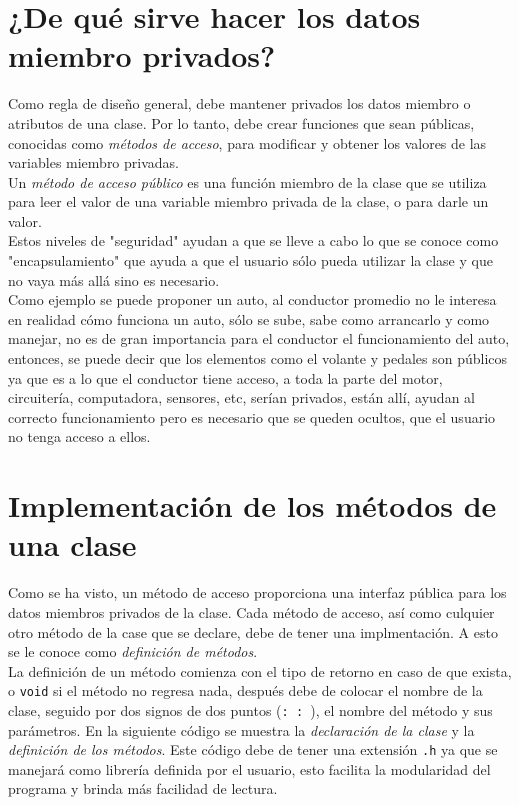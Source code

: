 \documentclass[12pt]{extarticle}
\newcommand{\<}{\langle}
\renewcommand{\>}{\rangle}
\theoremstyle{definition}
\begin{document}
\section{¿De qué sirve hacer los datos miembro privados? }
Como regla de diseño general, debe mantener privados los datos miembro o atributos  de una clase. Por lo tanto, debe crear funciones que sean públicas, conocidas como \textit{métodos de acceso}, para modificar  y obtener los valores de las variables miembro privadas.  \\

Un \textit{método de acceso público} es una función miembro de la clase que se utiliza para leer el valor de una variable miembro privada de la clase, o para darle un valor. \\

Estos niveles de "seguridad" ayudan a que se lleve a cabo lo que se conoce como "encapsulamiento" que ayuda a que el usuario sólo pueda utilizar la clase y que no vaya más allá sino es necesario. \\

Como ejemplo se puede proponer un auto, al conductor promedio no le interesa en realidad cómo funciona un auto, sólo se sube, sabe como arrancarlo y como manejar, no es de gran importancia para el conductor el funcionamiento del auto, entonces, se puede decir que los elementos como el volante y pedales son públicos ya que es a lo que el conductor tiene acceso, a toda la parte del motor, circuitería, computadora, sensores, etc, serían privados, están allí, ayudan al correcto funcionamiento pero es necesario que se queden ocultos, que el usuario no tenga acceso a ellos. \\


\section{Implementación de los métodos de una clase}

Como se ha visto, un método de acceso proporciona una interfaz pública para los datos miembros privados de la clase. Cada método de acceso, así como culquier otro método de la case que se declare, debe de tener una implmentación. A esto se le conoce como \textit{definición de métodos}.\\

La definición de un método comienza con el tipo de retorno en caso de que exista, o \verb|void| si el método no regresa nada, después debe de colocar el nombre de la clase, seguido por dos signos de dos puntos (\verb|: : |), el nombre del método y sus parámetros. En la siguiente código  se muestra la \textit{declaración de la clase} y la \textit{definición de los métodos}. Este código debe de tener una extensión \verb|.h| ya que se manejará como librería definida por el usuario, esto facilita la modularidad del programa y brinda más facilidad de lectura. 
\end{document}
